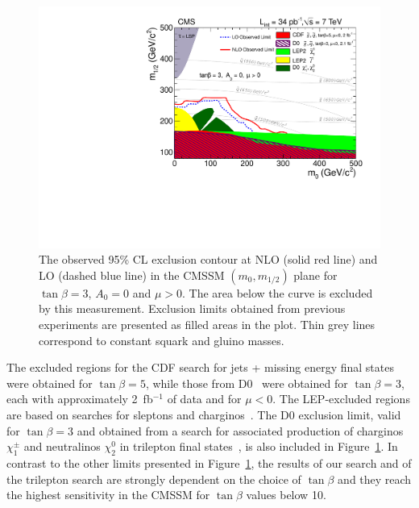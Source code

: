 \begin{figure}[tbh]
\begin{center}
\includegraphics[width=1\linewidth]{plots_final/RA6_ExclusionLimit_tanb3_LO.pdf}
\caption{\label{fig:msugra}\protect 
The observed 95\% CL exclusion contour at NLO (solid red line) and LO (dashed blue line) 
in the CMSSM $(m_0,m_{1/2})$ plane for  $\tan\beta=3$, $A_0 = 0$ and $\mu > 0$. 
The area below the curve is excluded by this measurement. Exclusion limits obtained from 
previous experiments are presented as filled areas in the plot. Thin grey lines correspond to 
constant squark and gluino masses.
}
\end{center}
\end{figure}

The excluded regions  for the CDF
search for  jets + missing  energy final states~\cite{PhysRevLett.102.121801} were
obtained for $\tan\beta=5$, while those from D0~\cite{Abazov2008449} were obtained for 
$\tan\beta=3$, each with  approximately  2~fb$^{-1}$ of  data and for $\mu < 0$. 
The  LEP-excluded
regions  are based  on searches  for  sleptons and  charginos~\cite{LEPSUSY}.  
The D0 exclusion limit, valid for $\tan\beta=3$  and obtained from
a  search  for  associated  production   of  charginos $\chi_{1}^{\pm}$ and
neutralinos $\chi_2^0$ in  trilepton final states~\cite{Abazov200934}, is also
included  in Figure~\ref{fig:msugra}. In  contrast to  the other  limits  presented in
Figure~\ref{fig:msugra},  the results of our search and of the  trilepton search are  strongly dependent on
the choice  of $\tan\beta$ and  they reach the  highest sensitivity  in the
CMSSM for $\tan\beta$ values below 10.

